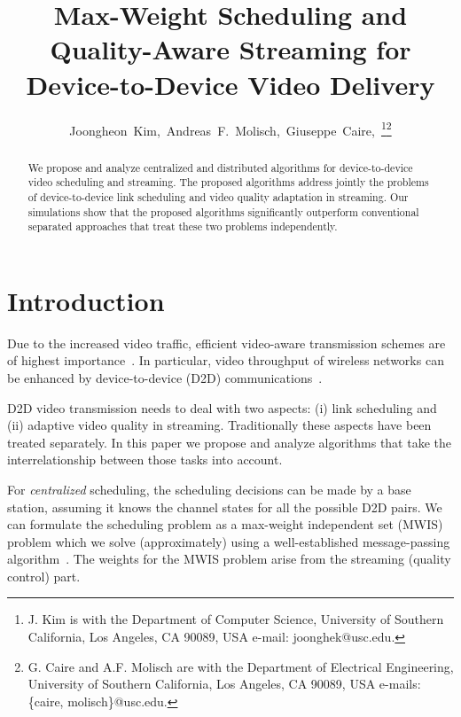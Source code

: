 \documentclass[journal]{IEEEtran}
\begin{document}
\title{Max-Weight Scheduling and Quality-Aware Streaming for Device-to-Device Video Delivery}

\author{Joongheon~Kim,~Andreas~F.~Molisch,~Giuseppe~Caire,~\thanks{J. Kim is with the Department of Computer Science, University of Southern California, Los Angeles, CA 90089, USA e-mail: joonghek@usc.edu.}\thanks{G. Caire and A.F. Molisch are with the Department of Electrical Engineering, University of Southern California, Los Angeles, CA 90089, USA e-mails: \{caire, molisch\}@usc.edu.}}
\maketitle

\begin{abstract}
We propose and analyze centralized and distributed algorithms for device-to-device video scheduling and streaming.
The proposed algorithms address jointly
the problems of device-to-device link scheduling and
video quality adaptation in streaming.
Our simulations show that the proposed algorithms significantly outperform conventional separated approaches that treat these two problems independently.
\end{abstract}


\section{Introduction}
Due to the increased video traffic, efficient video-aware transmission schemes are of highest importance~\cite{cm2013golrezaei}.
In particular, video throughput of wireless networks can be enhanced by device-to-device (D2D) communications~\cite{jsac2014ji}.

D2D video transmission needs to deal with two aspects: (i) link scheduling and (ii) adaptive video quality in streaming. Traditionally these aspects have been treated separately. In this paper we propose and analyze algorithms that take the interrelationship between those tasks into account.


For \textit{centralized} scheduling, the scheduling decisions can be made by a base station, assuming it knows the channel states for all the possible D2D pairs.
We can formulate the scheduling problem as a max-weight independent set (MWIS) problem which we solve (approximately) using a well-established message-passing algorithm~\cite{tit2009sanghavi}.
The weights for the MWIS problem arise from the streaming (quality control) part.
\end{document}
